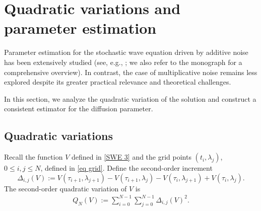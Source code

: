 \documentclass[11pt,reqno]{amsart}
\numberwithin{equation}{section}
\newcommand{\1}{{\bf 1}}
\newcommand{\2}{{\bf 2}}
\begin{document}
      
             
      
  
     
\section{Quadratic variations and parameter estimation}\label{QVPE}
Parameter    estimation for the stochastic wave equation driven by    additive noise has been extensively studied (see, e.g., \cite{AGT2022, KT2018, KTZ2018, Shev2023};  we also refer to  the monograph \cite{T2023} for   a comprehensive overview). In contrast,  the case of  multiplicative noise   remains less explored despite its greater practical relevance and theoretical challenges.

In this section, we analyze the quadratic variation of the solution and construct a consistent estimator for the diffusion parameter.
   \subsection{Quadratic  variations} \label{Sec QV}
     Recall the function $V$  defined in \eqref{SWE 3} and the    grid points $(t_i, \lambda_j)$,  $0\le i, j\le N$, defined in   \eqref{eq grid}.
   Define the second-order increment
  $$
\Delta_{i,j}(V) := V\left(\tau_{i+1}, \lambda_{j+1}  \right)-V\left(\tau_{i+1}, \lambda_{j}\right)-V\left(\tau_{i}, \lambda_{j+1}  \right) +V\left(\tau_{i}, \lambda_{j}    \right).
$$
    The  second-order  quadratic variation of $V$ is   
   \begin{align}\label{eq V V}
Q_{N}(V):=  \sum_{i=0}^{N-1}\sum_{j=0}^{N-1}\Delta_{i,j}(V)^2.
\end{align}
\end{document}
